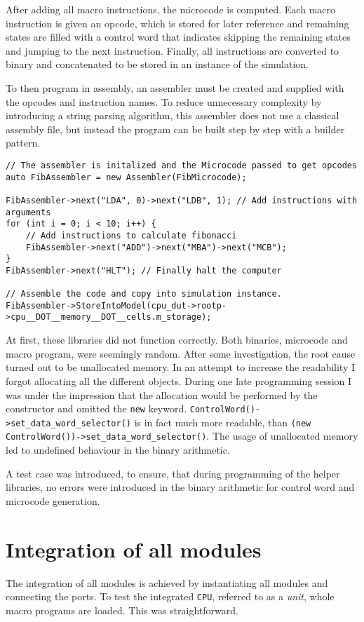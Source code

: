 After adding all macro instructions, the microcode is computed. Each macro instruction is given an opcode, which is stored for later reference and remaining states are filled with a control word that indicates skipping the remaining states and jumping to the next instruction. Finally, all instructions are converted to binary and concatenated to be stored in an instance of the simulation. 

To then program in assembly, an assembler must be created and supplied with the opcodes and instruction names. To reduce unnecessary complexity by introducing a string parsing algorithm, this assembler does not use a classical assembly file, but instead the program can be built step by step with a builder pattern. 
\pagebreak

\begin{lstlisting}[caption=Initialization of Assembler and programming of macrocode ]
// The assembler is initalized and the Microcode passed to get opcodes
auto FibAssembler = new Assembler(FibMicrocode); 

FibAssembler->next("LDA", 0)->next("LDB", 1); // Add instructions with arguments
for (int i = 0; i < 10; i++) {
    // Add instructions to calculate fibonacci
    FibAssembler->next("ADD")->next("MBA")->next("MCB"); 
}
FibAssembler->next("HLT"); // Finally halt the computer

// Assemble the code and copy into simulation instance.
FibAssembler->StoreIntoModel(cpu_dut->rootp->cpu__DOT__memory__DOT__cells.m_storage); 
\end{lstlisting}

At first, these libraries did not function correctly. Both binaries, microcode and macro program, were seemingly random. After some investigation, the root cause turned out to be unallocated memory. In an attempt to increase the readability I forgot allocating all the different objects. During one late programming session I was under the impression that the allocation would be performed by the constructor and omitted the \texttt{new} keyword. \texttt{ControlWord()->set\_data\_word\_selector()} is in fact much more readable, than \texttt{(new ControlWord())->set\_data\_word\_selector()}. The usage of unallocated memory led to undefined behaviour in the binary arithmetic.

A test case was introduced, to ensure, that during programming of the helper libraries, no errors were introduced in the binary arithmetic for control word and microcode generation.

\section{Integration of all modules} \label{sec:integration}
The integration of all modules is achieved by instantiating all modules and connecting the ports. To test the integrated \texttt{CPU}, referred to as a \textit{unit}, whole macro programs are loaded. This was straightforward. 

